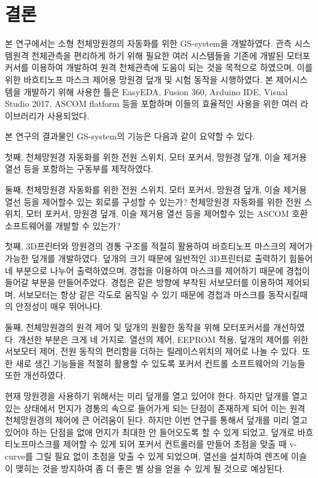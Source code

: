 \section{결론}
본 연구에서는 소형 천체망원경의 자동화를 위한 GS-system을 개발하였다. 
관측 시스템원격 천체관측을 편리하게 하기 위해 필요한 여러 시스템들을 기존에 개발된 모터포커서를 이용하여 개발하여 원격 천체관측에 도움이 되는 것을 목적으로 하였으며, 이를 위한 바흐티노프 마스크 제어용 망원경 덮개 및 시험 동작을 시행하였다. 본 제어시스템을 개발하기 위해 사용한 틀은 EasyEDA, Fusion 360, Arduino IDE, Visual Studio 2017, ASCOM flatform 등을 포함하며 이들의 효율적인 사용을 위한 여러 라이브러리가 사용되었다.

본 연구의 결과물인 GS-system의 기능은 다음과 같이 요약할 수 있다. 

첫째, 천체망원경 자동화를 위한 전원 스위치, 모터 포커서, 망원경 덮개, 이슬 제거용 열선 등을 포함하는 구동부를 제작하였다. 

둘째, 천체망원경 자동화를 위한 전원 스위치, 모터 포커서, 망원경 덮개, 이슬 제거용 열선 등을 제어할수 있는 회로를 구성할 수 있는가?
천체망원경 자동화를 위한 전원 스위치, 모터 포커서, 망원경 덮개, 이슬 제거용 열선 등을 제어할수 있는 ASCOM 호환 소프트웨어를 개발할 수 있는가?

첫째, 3D프린터와 망원경의 경통 구조를 적절히 활용하여 바흐티노프 마스크의 제어가 가능한 덮개를 개발하였다. 덮개의 크기 때문에 일반적인 3D프린터로 출력하기 힘들어 네 부분으로 나누어 출력하였으며, 경첩을 이용하여 마스크를 제어하기 때문에 경첩이 들어갈 부분을 만들어주었다. 경첩은 같은 방향에 부착된 서보모터를 이용하여 제어되며, 서보모터는 항상 같은 각도로 움직일 수 있기 때문에 경첩과 마스크를 동작시킬때의 안정성이 매우 뛰어나다.

둘째, 천체망원경의 원격 제어 및 덮개의 원활한 동작을 위해 모터포커서를 개선하였다. 개선한 부분은 크게 네 가지로. 열선의 제어, EEPROM 적용, 덮개의 제어를 위한 서보모터 제어, 전원 동작의 편리함을 더하는 릴레이스위치의 제어로 나놀 수 있다. 또한 새로 생긴 기능들을 적절히 활용할 수 있도록 포커서 컨트롤 소프트웨어의 기능들 또한 개선하였다.

현재 망원경을 사용하기 위해서는 미리 덮개를 열고 있어야 한다. 하지만 덮개를 열고 있는 상태에서 먼지가 경통의 속으로 들어가게 되는 단점이 존재하게 되어 이는 원격 천체망원경의 제어에 큰 어려움이 된다. 하지만 이번 연구를 통해서 덮개를 미리 열고 있어야 하는 단점을 없애 먼지가 최대한 안 들어오도록 할 수 있게 되었고, 덮개로 바흐티노프마스크를 제어할 수 있게 되어 포커서 컨트롤러를 만들어 초점을 맞출 때 v-curve를 그릴 필요 없이 초점을 맞출 수 있게 되었으며, 열선을 설치하여 렌즈에 이슬이 맺히는 것을 방지하여 좀 더 좋은 별 상을 얻을 수 있게 될 것으로 예상된다.